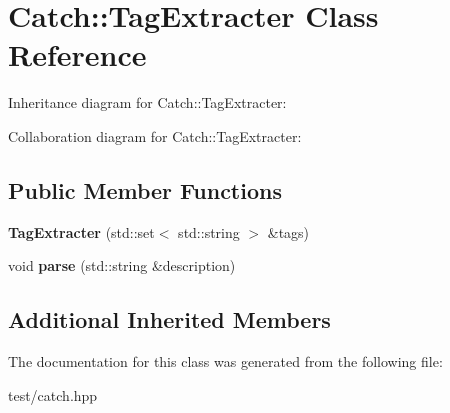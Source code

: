 \hypertarget{classCatch_1_1TagExtracter}{}\section{Catch\+:\+:Tag\+Extracter Class Reference}
\label{classCatch_1_1TagExtracter}


Inheritance diagram for Catch\+:\+:Tag\+Extracter\+:


Collaboration diagram for Catch\+:\+:Tag\+Extracter\+:
\subsection*{Public Member Functions}
\begin{DoxyCompactItemize}
\item 
{\bfseries Tag\+Extracter} (std\+::set$<$ std\+::string $>$ \&tags)\hypertarget{classCatch_1_1TagExtracter_a146d1ab5e247d5ec7c2c61a8c59b7950}{}\label{classCatch_1_1TagExtracter_a146d1ab5e247d5ec7c2c61a8c59b7950}

\item 
void {\bfseries parse} (std\+::string \&description)\hypertarget{classCatch_1_1TagExtracter_a2f9446590db696802be81b0f743bf9f6}{}\label{classCatch_1_1TagExtracter_a2f9446590db696802be81b0f743bf9f6}

\end{DoxyCompactItemize}
\subsection*{Additional Inherited Members}


The documentation for this class was generated from the following file\+:\begin{DoxyCompactItemize}
\item 
test/catch.\+hpp\end{DoxyCompactItemize}
